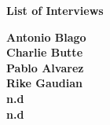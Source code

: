 \begin{center}
\vspace{2cm}    

\Large{\textbf{List of Interviews}}
\vspace{2cm}
\end{center}

\begin{flushleft}
\textbf{Antonio Blago}\\
\textbf{Charlie Butte}\\
\textbf{Pablo Alvarez}\\
\textbf{Rike Gaudian}\\
\textbf{n.d}\\
\textbf{n.d}\\
\end{flushleft}

